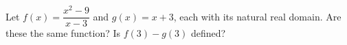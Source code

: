 Let $f(x)=\dfrac{x^2-9}{x-3}$ and $g(x)=x+3$, each with its natural real domain. Are these the same function? Is $f(3)-g(3)$ defined?
